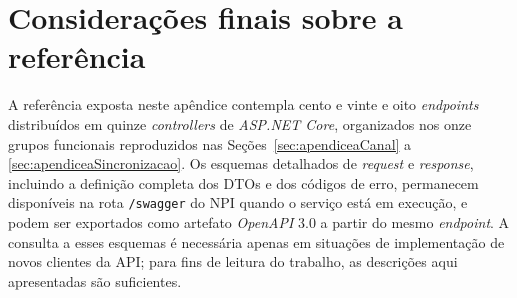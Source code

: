 \section{Considerações finais sobre a referência}\label{sec:apendiceaConsideracoes}

A referência exposta neste apêndice contempla cento e vinte e oito \textit{endpoints} distribuídos em quinze \textit{controllers} de \textit{ASP.NET Core}, organizados nos onze grupos funcionais reproduzidos nas Seções~\ref{sec:apendiceaCanal} a \ref{sec:apendiceaSincronizacao}. Os esquemas detalhados de \textit{request} e \textit{response}, incluindo a definição completa dos DTOs e dos códigos de erro, permanecem disponíveis na rota \texttt{/swagger} do NPI quando o serviço está em execução, e podem ser exportados como artefato \textit{OpenAPI} 3.0 a partir do mesmo \textit{endpoint}. A consulta a esses esquemas é necessária apenas em situações de implementação de novos clientes da API; para fins de leitura do trabalho, as descrições aqui apresentadas são suficientes.
